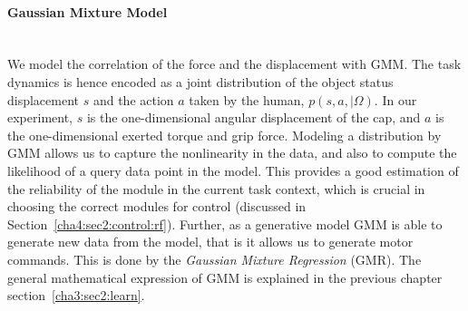 
\paragraph{Gaussian Mixture Model} ~\\
We model the correlation of the force and the displacement with
GMM. The task dynamics is hence encoded as a joint distribution of the object status displacement $s$ and the action $a$ taken by the human, $p(s,a,{\mid}{\Omega})$. In our experiment, $s$ is the one-dimensional angular displacement of the cap, and $a$ is the one-dimensional exerted torque and grip force.
Modeling a distribution by GMM allows us to capture the nonlinearity in the data, and also to compute the likelihood of a query data point in the model. This provides a good estimation of the reliability of the module in the current task context, which is crucial in choosing the correct modules for control  (discussed in Section~\ref{cha4:sec2:control:rf}).
Further, as a generative model GMM is able to
generate new data from the model, that is it allows us to generate motor commands. This is done by the {\em Gaussian Mixture Regression} (GMR). The general mathematical expression of GMM is explained in the previous chapter section~\ref{cha3:sec2:learn}. 

